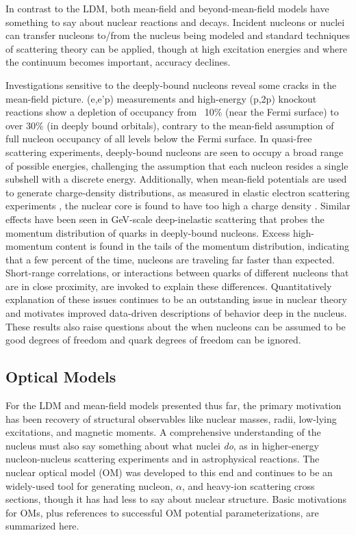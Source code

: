 In contrast to the LDM, both mean-field and beyond-mean-field models have
something to say about nuclear reactions and decays. Incident nucleons or nuclei can
transfer nucleons to/from the nucleus being modeled and standard
techniques of scattering theory can be applied, though at high excitation
energies and where the continuum becomes important, accuracy declines.

Investigations sensitive to the deeply-bound nucleons reveal some cracks in the mean-field
picture.  (e,e'p) measurements \cite{eep1, eep2} and high-energy (p,2p) knockout reactions 
\cite{knockout1, knockout2} show a depletion of occupancy from ~10\% (near the Fermi surface) to
over 30\% (in deeply bound orbitals), contrary to the mean-field assumption of
full nucleon occupancy of all levels below the Fermi surface. In quasi-free
scattering experiments, deeply-bound nucleons are seen to occupy a broad range
of possible energies, challenging the assumption that each
nucleon resides a single subshell with a discrete energy. Additionally, when mean-field
potentials are used to generate charge-density distributions, as measured in
elastic electron scattering experiments \cite{DeVries}, the nuclear core is found to
have too high a charge density \cite{ChargeDensityCoreExample}. Similar
effects have been seen in GeV-scale deep-inelastic scattering that probes the momentum
distribution of quarks in deeply-bound nucleons. Excess high-momentum content is
found in the tails of the momentum distribution, indicating that a few percent of the time, 
nucleons are traveling far faster than expected. Short-range correlations, or
interactions between quarks of different nucleons that are in close proximity,
are invoked to explain these differences.
Quantitatively explanation of these issues continues to be an outstanding issue in nuclear 
theory and motivates improved data-driven descriptions of behavior deep in the nucleus.
These results also raise questions about
the when nucleons can be assumed to be good degrees of freedom and quark degrees of freedom 
can be ignored.

\subsection{Optical Models}
For the LDM and mean-field models presented thus far, the primary motivation has been recovery
of structural observables like nuclear masses, radii, low-lying excitations, and magnetic moments. 
A comprehensive understanding of the nucleus must also say something about what
nuclei \textit{do}, as in higher-energy nucleon-nucleus scattering experiments
and in astrophysical reactions.
The nuclear optical model (OM) was developed to this end and continues to be an
widely-used tool for generating nucleon, $\alpha$, and heavy-ion scattering
cross sections, though it has had less to say about nuclear structure. Basic
motivations for OMs, plus references to successful OM potential parameterizations,
are summarized here.

